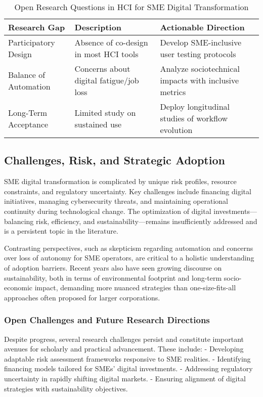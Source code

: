 \documentclass[sigconf]{acmart}
\begin{document}
\begin{table*}[htbp]
\centering
\caption{Open Research Questions in HCI for SME Digital Transformation}
\label{tab:hci-research-questions}
\begin{adjustbox}{max width=\textwidth}
\begin{tabular}{@{}lll@{}}
\toprule
Research Gap & Description & Actionable Direction \\
\midrule
Participatory Design & Absence of co-design in most HCI tools & Develop SME-inclusive user testing protocols \\
Balance of Automation & Concerns about digital fatigue/job loss & Analyze sociotechnical impacts with inclusive metrics \\
Long-Term Acceptance & Limited study on sustained use & Deploy longitudinal studies of workflow evolution \\
\bottomrule
\end{tabular}
\end{adjustbox}
\end{table*}

\subsection{Challenges, Risk, and Strategic Adoption}

SME digital transformation is complicated by unique risk profiles, resource constraints, and regulatory uncertainty. Key challenges include financing digital initiatives, managing cybersecurity threats, and maintaining operational continuity during technological change. The optimization of digital investments—balancing risk, efficiency, and sustainability—remains insufficiently addressed and is a persistent topic in the literature.

Contrasting perspectives, such as skepticism regarding automation and concerns over loss of autonomy for SME operators, are critical to a holistic understanding of adoption barriers. Recent years also have seen growing discourse on sustainability, both in terms of environmental footprint and long-term socio-economic impact, demanding more nuanced strategies than one-size-fits-all approaches often proposed for larger corporations.

\subsubsection{Open Challenges and Future Research Directions}

Despite progress, several research challenges persist and constitute important avenues for scholarly and practical advancement. These include:
\newline
- Developing adaptable risk assessment frameworks responsive to SME realities.
\newline
- Identifying financing models tailored for SMEs’ digital investments.
\newline
- Addressing regulatory uncertainty in rapidly shifting digital markets.
\newline
- Ensuring alignment of digital strategies with sustainability objectives.
\newline
\end{document}
